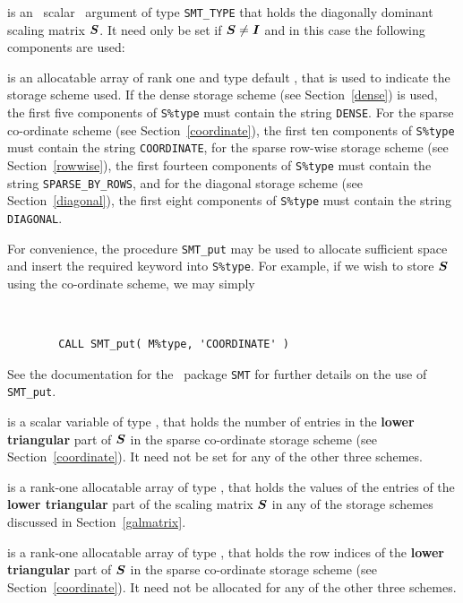 \documentclass{galahad}
\begin{document}
\begin{description}
 is an \optional\ scalar \intentin\ argument of type {\tt SMT\_TYPE}
that holds the diagonally dominant scaling matrix ${\bm{S}}$. It need only be set
if ${\bm{S}} \neq {\bm{I}}$ and in this case the following components are used:

\begin{description}

 is an allocatable array of rank one and type default
\character, that
is used to indicate the storage scheme used. If the dense storage scheme
(see Section~\ref{dense}) is used,
the first five components of {\tt S\%type} must contain the
string {\tt DENSE}.
For the sparse co-ordinate scheme (see Section~\ref{coordinate}),
the first ten components of {\tt S\%type} must contain the
string {\tt COORDINATE},
for the sparse row-wise storage scheme (see Section~\ref{rowwise}),
the first fourteen components of {\tt S\%type} must contain the
string {\tt SPARSE\_BY\_ROWS},
and for the diagonal storage scheme (see Section~\ref{diagonal}),
the first eight components of {\tt S\%type} must contain the
string {\tt DIAGONAL}.

For convenience, the procedure {\tt SMT\_put}
may be used to allocate sufficient space and insert the required keyword
into {\tt S\%type}.
For example, if we wish to store ${\bm{S}}$ using the co-ordinate scheme,
we may simply
{\tt
\begin{verbatim}
        CALL SMT_put( M%type, 'COORDINATE' )
\end{verbatim}
}
\noindent
See the documentation for the \galahad\ package {\tt SMT}
for further details on the use of {\tt SMT\_put}.

 is a scalar variable of type \integer, that
holds the number of entries in the {\bf lower triangular} part of ${\bm{S}}$
in the sparse co-ordinate storage scheme (see Section~\ref{coordinate}).
It need not be set for any of the other three schemes.

 is a rank-one allocatable array of type \realdp, that holds
the values of the entries of the {\bf lower triangular} part
of the scaling matrix ${\bm{S}}$ in any of the
storage schemes discussed in Section~\ref{galmatrix}.

 is a rank-one allocatable array of type \integer,
that holds the row indices of the {\bf lower triangular} part of ${\bm{S}}$
in the sparse co-ordinate storage
scheme (see Section~\ref{coordinate}).
It need not be allocated for any of the other three schemes.


\end{description}
\end{description}
\end{document}

